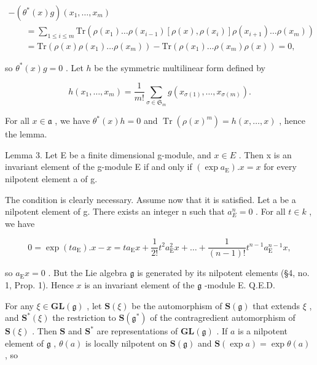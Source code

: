 \[
\begin{array}{l} - (\theta^ {*} (x) g) (x _ {1}, \ldots , x _ {m}) \\ \qquad = \sum_ {1 \leq i \leq m} \mathrm{Tr} (\rho (x _ {1}) \ldots \rho (x _ {i - 1}) [ \rho (x), \rho (x _ {i}) ] \rho (x _ {i + 1}) \ldots \rho (x _ {m})) \\ \qquad = \mathrm{Tr} (\rho (x) \rho (x _ {1}) \ldots \rho (x _ {m})) - \mathrm{Tr} (\rho (x _ {1}) \ldots \rho (x _ {m}) \rho (x)) = 0, \end{array}
\]

so \(\theta^{*}(x)g = 0\) . Let \(h\) be the symmetric multilinear form defined by

\[
h (x _ {1}, \dots , x _ {m}) = \frac {1}{m !} \sum_ {\sigma \in \mathfrak {S} _ {m}} g (x _ {\sigma (1)}, \dots , x _ {\sigma (m)}).
\]

For all \(x \in \mathfrak{a}\) , we have \(\theta^{*}(x)h = 0\) and \(\operatorname{Tr}(\rho(x)^m) = h(x, \ldots, x)\) , hence the lemma.

Lemma 3. Let E be a finite dimensional g-module, and \(x \in E\) . Then x is an invariant element of the g-module E if and only if \((\exp a_{\mathrm{E}}).x = x\) for every nilpotent element a of g.

The condition is clearly necessary. Assume now that it is satisfied. Let a be a nilpotent element of g. There exists an integer n such that \(a_{E}^{n}=0\) . For all \(t\in k\) , we have

\[
0 = \exp (t a _ {\mathrm{E}}). x - x = t a _ {\mathrm{E}} x + \frac {1}{2 !} t ^ {2} a _ {\mathrm{E}} ^ {2} x + \dots + \frac {1}{(n - 1) !} t ^ {n - 1} a _ {\mathrm{E}} ^ {n - 1} x,
\]

so \(a_{\mathrm{E}}x = 0\) . But the Lie algebra \(\mathfrak{g}\) is generated by its nilpotent elements (§4, no. 1, Prop. 1). Hence \(x\) is an invariant element of the \(\mathfrak{g}\) -module E. Q.E.D.

For any \(\xi \in \mathbf{GL}(\mathfrak{g})\) , let \(\mathbf{S}(\xi)\) be the automorphism of \(\mathbf{S}(\mathfrak{g})\) that extends \(\xi\) , and \(\mathbf{S}^*(\xi)\) the restriction to \(\mathbf{S}(\mathfrak{g}^*)\) of the contragredient automorphism of \(\mathbf{S}(\xi)\) . Then \(\mathbf{S}\) and \(\mathbf{S}^*\) are representations of \(\mathbf{GL}(\mathfrak{g})\) . If \(a\) is a nilpotent element of \(\mathfrak{g}\) , \(\theta(a)\) is locally nilpotent on \(\mathbf{S}(\mathfrak{g})\) and \(\mathbf{S}(\exp a) = \exp \theta(a)\) , so

